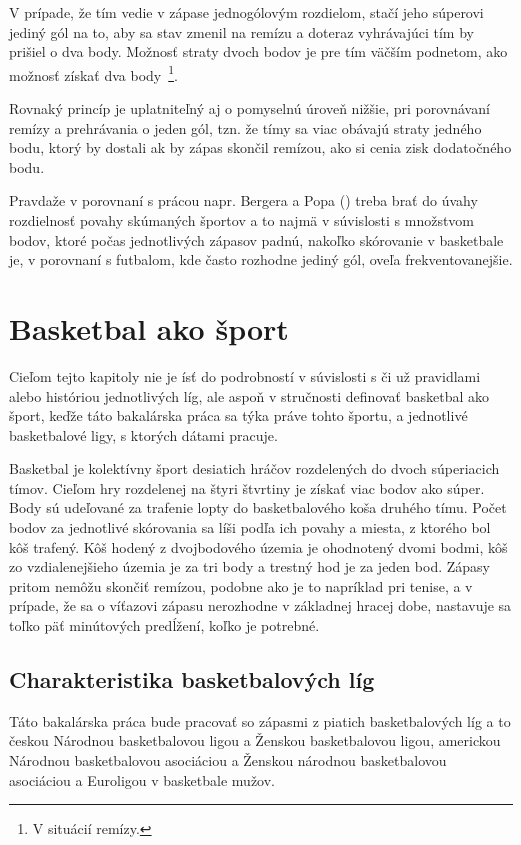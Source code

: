 \documentclass[
  digital, %
  oneside, %
  notable,   %
  lof,     %
  lot,     %
]{fithesis3}
\begin{document}
		V prípade, že tím vedie v zápase jednogólovým rozdielom, stačí jeho súperovi jediný gól na to, aby sa stav zmenil na remízu a doteraz vyhrávajúci tím by prišiel o dva body. Možnosť straty dvoch bodov je pre tím väčším podnetom, ako možnosť získať dva body~\footnote{V situácií remízy.}. 
	
		Rovnaký princíp je uplatniteľný aj o pomyselnú úroveň nižšie, pri porovnávaní remízy a prehrávania o jeden gól, tzn. že tímy sa viac obávajú straty jedného bodu, ktorý by dostali ak by zápas skončil remízou, ako si cenia zisk dodatočného bodu. \parencite[s.~1768]{schneemann2017}
		
		Pravdaže v porovnaní s prácou napr. Bergera a Popa (\citeyear{berger2011}) treba brať do úvahy rozdielnosť povahy skúmaných športov a to najmä v súvislosti s množstvom bodov, ktoré počas jednotlivých zápasov padnú, nakoľko skórovanie v basketbale je, v porovnaní s futbalom, kde často rozhodne jediný gól, oveľa frekventovanejšie.
				
	\chapter{Basketbal ako šport}
	Cieľom tejto kapitoly nie je ísť do podrobností v súvislosti s či už pravidlami alebo históriou jednotlivých líg, ale aspoň v stručnosti definovať basketbal ako šport, keďže táto bakalárska práca sa týka práve tohto športu, a jednotlivé basketbalové ligy, s ktorých dátami pracuje.
	
	Basketbal je kolektívny šport desiatich hráčov rozdelených do dvoch súperiacich tímov. Cieľom hry rozdelenej na štyri štvrtiny je získať viac bodov ako súper. Body sú udeľované za trafenie lopty do basketbalového koša druhého tímu. Počet bodov za jednotlivé skórovania sa líši podľa ich povahy a miesta, z ktorého bol kôš trafený. Kôš hodený z dvojbodového územia je ohodnotený dvomi bodmi, kôš zo vzdialenejšieho územia je za tri body a trestný hod je za jeden bod. Zápasy pritom nemôžu skončiť remízou, podobne ako je to napríklad pri tenise, a v prípade, že sa o víťazovi zápasu nerozhodne v základnej hracej dobe, nastavuje sa toľko päť minútových predĺžení, koľko je potrebné.
	
		\section{Charakteristika basketbalových líg}
		Táto bakalárska práca bude pracovať so zápasmi z piatich basketbalových líg a to českou Národnou basketbalovou ligou a Ženskou basketbalovou ligou, americkou Národnou basketbalovou asociáciou a Ženskou národnou basketbalovou asociáciou a Euroligou v basketbale mužov.
		
\end{document}
